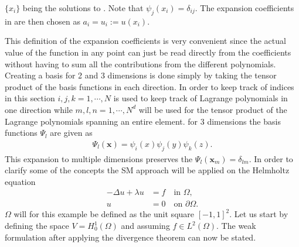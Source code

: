 $\{x_i\}$ being the solutions to . Note that $\psi_j(x_i) = \delta_{ij}$.
The expansion coefficients in  are then chosen as $a_i = u_i :=u(x_i)$. 

This definition of the expansion coefficients is very convenient since the actual value of 
the function in any point can just be read directly from the coefficients without having to 
sum all the contributions from the different polynomials.
Creating a basis for 2 and 3 dimensions is done simply by taking the tensor product 
of the basis functions in each direction. In order to keep track of indices in this section
$i,j,k = 1,\cdots,N$ is used to keep track of Lagrange polynomials in one direction 
while $m,l,n = 1,\cdots,N^d$ will be used for the tensor product of the Lagrange polynomials spanning
an entire element.
for 3 dimensions the basis functions $\Psi_{l}$ are given as 
\begin{align}
    \Psi_{l}(\mathbf{x}) = \psi_i(x)\psi_j(y)\psi_k(z).
    \label{eq:3dbasis}
\end{align}
This expansion to multiple dimensions preserves the $\Psi_l(\mathbf{x}_m) = \delta_{lm}$.
In order to clarify some of the concepts the SM approach will be applied on the Helmholtz equation
%
\begin{align}
    -\Delta u + \lambda u &= f \quad \text{in } \Omega, \\
    u &= 0 \quad \text{on } \partial \Omega.
    \label{eq:Helmholtz}
\end{align}
%
$\Omega$ will for this example be defined as the unit square $[-1,1]^2$. 
Let us start by defining the space $V =H^1_0(\Omega)$ and assuming $f\in L^2(\Omega)$. 
The weak formulation after applying the divergence theorem can now be stated.

